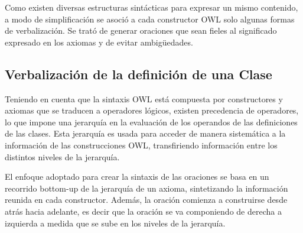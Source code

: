 Como existen diversas estructuras sintácticas para expresar un mismo contenido, a modo de simplificación se asoció a cada constructor OWL solo algunas formas de verbalización. Se trató de generar oraciones que sean fieles al significado expresado en los axiomas y de evitar ambigüedades.


\subsection{Verbalización de la definición de una Clase}
Teniendo en cuenta que la sintaxis OWL está compuesta por constructores y axiomas que se traducen a operadores lógicos, existen precedencia de operadores, lo que impone una jerarquía en la evaluación de los operandos de las definiciones de las clases. Esta jerarquía es usada para acceder de manera sistemática a la información de las construcciones OWL, transfiriendo información entre los distintos niveles de la jerarquía.

El enfoque adoptado para crear la sintaxis de las oraciones se basa en un recorrido bottom-up de la jerarquía de un axioma, sintetizando la información reunida en cada constructor. Además, la oración comienza a construirse desde atrás hacia adelante, es decir que la oración se va componiendo de derecha a izquierda a medida que se sube en los niveles de la jerarquía.

